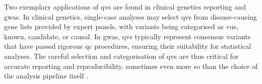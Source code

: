 
Two exemplary applications of \ac{qv}s are found in clinical genetics reporting and \ac{gwas}. In clinical genetics, single-case analyses may select \ac{qv}s from disease-causing gene lists provided by expert panels, with variants being categorised as \ac{vus}, known, candidate, or causal. In \ac{gwas}, \ac{qv}s typically represent consensus variants that have passed rigorous \ac{qc} procedures, ensuring their suitability for statistical analyses. The careful selection and categorisation of \ac{qv}s are thus critical for accurate reporting and reproducibility, sometimes even more so than the choice of the analysis pipeline itself \cite{olson2023variant}.

